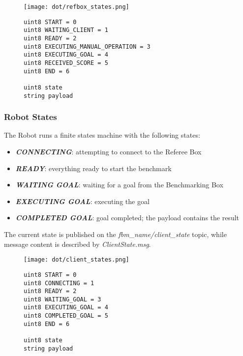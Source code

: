 \documentclass[a4paper]{article}
\begin{document}
\begin{figure}[t]
  \begin{center}
    \texttt{[image: dot/refbox\_states.png]}
  \end{center}
\end{figure}

\begin{figure}[h!]
	\noindent
	\begin{minipage}[t!]{\linewidth}
		\begin{lstlisting}[caption=RefBoxState.msg]
uint8 START = 0
uint8 WAITING_CLIENT = 1
uint8 READY = 2
uint8 EXECUTING_MANUAL_OPERATION = 3
uint8 EXECUTING_GOAL = 4
uint8 RECEIVED_SCORE = 5
uint8 END = 6

uint8 state
string payload
		\end{lstlisting}
	\end{minipage}
\end{figure}

\clearpage

\subsubsection{Robot States}

The Robot runs a finite states machine with the following states:
\begin{itemize}
  \item \textbf{\emph{CONNECTING}}: attempting to connect to the Referee Box
  \item \textbf{\emph{READY}}: everything ready to start the benchmark
  \item \textbf{\emph{WAITING GOAL}}: waiting for a goal from the Benchmarking Box
  \item \textbf{\emph{EXECUTING GOAL}}: executing the goal
  \item \textbf{\emph{COMPLETED GOAL}}: goal completed; the payload contains the result
\end{itemize}

The current state is published on the \emph{fbm\_name/client\_state} topic, while message content is described by \emph{ClientState.msg}.

\begin{figure}
  \begin{center}
    \texttt{[image: dot/client\_states.png]}
  \end{center}
\end{figure}

\begin{figure}[h!]
	\noindent
	\begin{minipage}[t!]{\linewidth}
		\begin{lstlisting}[caption=ClientState.msg]
uint8 START = 0
uint8 CONNECTING = 1
uint8 READY = 2
uint8 WAITING_GOAL = 3
uint8 EXECUTING_GOAL = 4
uint8 COMPLETED_GOAL = 5
uint8 END = 6

uint8 state
string payload
		\end{lstlisting}
	\end{minipage}
\end{figure}
\end{document}
